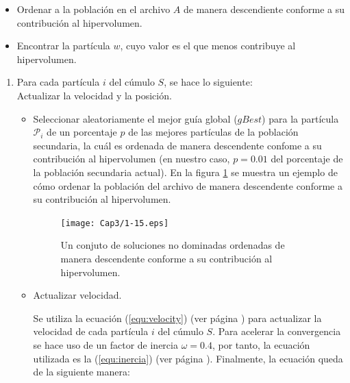 \begin{enumerate}
\begin{itemize}
      \item Ordenar a la poblaci\'on en el archivo $A$ de manera descendiente conforme a su contribuci\'on al hipervolumen.

      \item Encontrar la part\'icula $w$, cuyo valor es el que menos contribuye al hipervolumen.
      \end{itemize}

\begin{enumerate}
  \item Para cada part\'icula $i$ del c\'umulo $S$, se hace lo siguiente: \\

    Actualizar la  velocidad y la posici\'on.

    \begin{itemize}

      \item Seleccionar aleatoriamente el mejor gu\'ia global ($gBest$) para la part\'icula $\mathcal{P}_i$ de un porcentaje $p$
      de las mejores part\'iculas de la poblaci\'on secundaria, la cu\'al es ordenada de manera descendente confome a su 
      contribuci\'on al hipervolumen (en nuestro caso, $p=0.01$ del porcentaje de la poblaci\'on secundaria actual). 
      En la figura \ref{fig:ordenado} se muestra un ejemplo de c\'omo ordenar la poblaci\'on del archivo de manera descendente 
      conforme a su contribuci\'on al hipervolumen. 

      \begin{figure}
      \begin{center}
	  \texttt{[image: Cap3/1-15.eps]}
      \end{center}
	\caption[Ejemplo de soluciones no dominadas ordenadas]{Un conjuto de soluciones no dominadas ordenadas de manera 
	descendente conforme a su contribuci\'on al hipervolumen.}
      \label{fig:ordenado}
      \end{figure}

      \item Actualizar velocidad. 

      Se utiliza la ecuaci\'on (\ref{equ:velocity}) (ver p\'agina \pageref{equ:velocity}) 
      para actualizar la velocidad de cada part\'icula $i$ del c\'umulo $S$. Para acelerar la convergencia 
      se hace uso de un factor de inercia $\omega = 0.4$, por tanto, la ecuaci\'on utilizada es la
      (\ref{equ:inercia}) (ver p\'agina \pageref{equ:inercia}). Finalmente, la ecuaci\'on queda de la siguiente 
      manera:	


\end{itemize}
\end{enumerate}
\end{enumerate}

